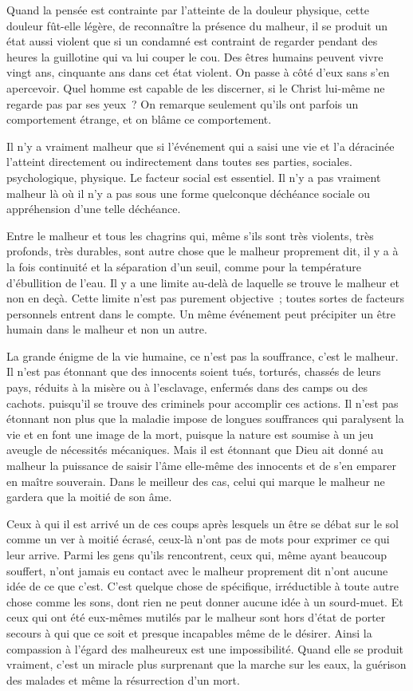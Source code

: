 \documentclass[french,twoside]{book} %
\begin{document}
Quand la pensée est contrainte par l'atteinte de la douleur physique, cette douleur fût-elle légère, de reconnaître la présence du malheur, il se produit un état aussi violent que si un condamné est contraint de regarder pendant des heures la guillotine qui va lui couper le cou. Des êtres humains peuvent vivre vingt ans, cinquante ans dans cet état violent. On passe à côté d'eux sans s'en apercevoir. Quel homme est capable de les discerner, si le Christ lui-même ne regarde pas par ses yeux ? On remarque seulement qu'ils ont parfois un comportement étrange, et on blâme ce comportement.\par
Il n'y a vraiment malheur que si l'événement qui a saisi une vie et l'a déracinée l'atteint directement ou indirectement dans toutes ses parties, sociales. psychologique, physique. Le facteur social est essentiel. Il n'y a pas vraiment malheur là où il n'y a pas sous une forme quelconque déchéance sociale ou appréhension d'une telle déchéance.\par
Entre le malheur et tous les chagrins qui, même s'ils sont très violents, très profonds, très durables, sont autre chose que le malheur proprement dit, il y a à la fois continuité et la séparation d'un seuil, comme pour la température d'ébullition de l'eau. Il y a une limite au-delà de laquelle se trouve le malheur et non en deçà. Cette limite n'est pas purement objective ; toutes sortes de facteurs personnels entrent dans le compte. Un même événement peut précipiter un être humain dans le malheur et non un autre.\par
La grande énigme de la vie humaine, ce n'est pas la souffrance, c'est le malheur. Il n'est pas étonnant que des innocents soient tués, torturés, chassés de leurs pays, réduits à la misère ou à l'esclavage, enfermés dans des camps ou des cachots. puisqu'il se trouve des criminels pour accomplir ces actions. Il n'est pas étonnant non plus que la maladie impose de longues souffrances qui paralysent la vie et en font une image de la mort, puisque la nature est soumise à un jeu aveugle de nécessités mécaniques. Mais il est étonnant que Dieu ait donné au malheur la puissance de saisir l'âme elle-même des innocents et de s'en emparer en maître souverain. Dans le meilleur des cas, celui qui marque le malheur ne gardera que la moitié de son âme.\par
Ceux à qui il est arrivé un de ces coups après lesquels un être se débat sur le sol comme un ver à moitié écrasé, ceux-là n'ont pas de mots pour exprimer ce qui leur arrive. Parmi les gens qu'ils rencontrent, ceux qui, même ayant beaucoup souffert, n'ont jamais eu contact avec le malheur proprement dit n'ont aucune idée de ce que c'est. C'est quelque chose de spécifique, irréductible à toute autre chose comme les sons, dont rien ne peut donner aucune idée à un sourd-muet. Et ceux qui ont été eux-mêmes mutilés par le malheur sont hors d'état de porter secours à qui que ce soit et presque incapables même de le désirer. Ainsi la compassion à l'égard des malheureux est une impossibilité. Quand elle se produit vraiment, c'est un miracle plus surprenant que la marche sur les eaux, la guérison des malades et même la résurrection d'un mort.\par
\end{document}
